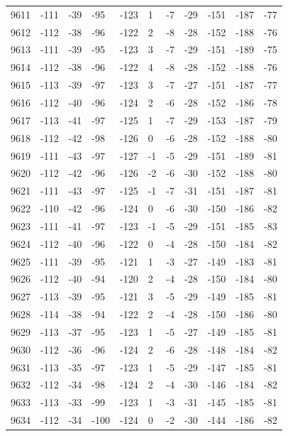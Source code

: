 \begin{table}[H]
\begin{tabular}{lllllllllll}
9611 & -111 & -39 & -95 & -123 & 1 & -7 & -29 & -151 & -187 & -77 \\
9612 & -112 & -38 & -96 & -122 & 2 & -8 & -28 & -152 & -188 & -76 \\
9613 & -111 & -39 & -95 & -123 & 3 & -7 & -29 & -151 & -189 & -75 \\
9614 & -112 & -38 & -96 & -122 & 4 & -8 & -28 & -152 & -188 & -76 \\
9615 & -113 & -39 & -97 & -123 & 3 & -7 & -27 & -151 & -187 & -77 \\
9616 & -112 & -40 & -96 & -124 & 2 & -6 & -28 & -152 & -186 & -78 \\
9617 & -113 & -41 & -97 & -125 & 1 & -7 & -29 & -153 & -187 & -79 \\
9618 & -112 & -42 & -98 & -126 & 0 & -6 & -28 & -152 & -188 & -80 \\
9619 & -111 & -43 & -97 & -127 & -1 & -5 & -29 & -151 & -189 & -81 \\
9620 & -112 & -42 & -96 & -126 & -2 & -6 & -30 & -152 & -188 & -80 \\
9621 & -111 & -43 & -97 & -125 & -1 & -7 & -31 & -151 & -187 & -81 \\
9622 & -110 & -42 & -96 & -124 & 0 & -6 & -30 & -150 & -186 & -82 \\
9623 & -111 & -41 & -97 & -123 & -1 & -5 & -29 & -151 & -185 & -83 \\
9624 & -112 & -40 & -96 & -122 & 0 & -4 & -28 & -150 & -184 & -82 \\
9625 & -111 & -39 & -95 & -121 & 1 & -3 & -27 & -149 & -183 & -81 \\
9626 & -112 & -40 & -94 & -120 & 2 & -4 & -28 & -150 & -184 & -80 \\
9627 & -113 & -39 & -95 & -121 & 3 & -5 & -29 & -149 & -185 & -81 \\
9628 & -114 & -38 & -94 & -122 & 2 & -4 & -28 & -150 & -186 & -80 \\
9629 & -113 & -37 & -95 & -123 & 1 & -5 & -27 & -149 & -185 & -81 \\
9630 & -112 & -36 & -96 & -124 & 2 & -6 & -28 & -148 & -184 & -82 \\
9631 & -113 & -35 & -97 & -123 & 1 & -5 & -29 & -147 & -185 & -81 \\
9632 & -112 & -34 & -98 & -124 & 2 & -4 & -30 & -146 & -184 & -82 \\
9633 & -113 & -33 & -99 & -123 & 1 & -3 & -31 & -145 & -185 & -81 \\
9634 & -112 & -34 & -100 & -124 & 0 & -2 & -30 & -144 & -186 & -82 \\

\end{tabular}
\end{table}
